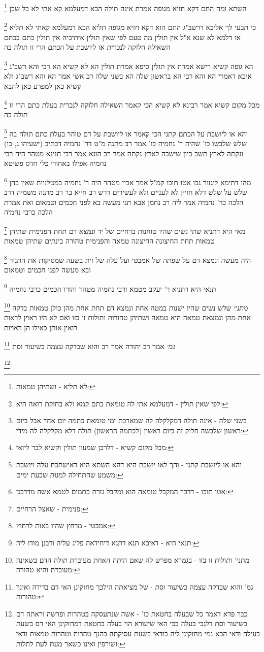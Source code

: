 \documentclass[12pt, openany]{book}
\newcommand{\footnotecomment}[1]{
	\renewcommand\thefootnote{}
	\footnote{#1}}
\newcommand{\commenta}[1]{\footnotecomment{#1}}
\begin{document}
{\commenta{לא תליא - ושתיהן טמאות:}
השתא ומה התם דקא חזיא מגופה אמרת אינה תולה הכא דמעלמא קא אתי לא כל שכן 
\commenta{לפי שאין תולין - דמעלמא אתי לה טומאת כתם קמא ולא בחזקת רואה היא:}
כי תבעי לך אליבא דרשב"ג התם הוא דקא חזיא מגופה תליא הכא דמעלמא קאתי לא תליא או דלמא לא שנא 
א"ל אין תולין מה טעם לפי שאין תולין 
איתיביה אין תולין כתם בכתם השאילה חלוקה לנכרית או ליושבת על הכתם הרי זו תולה בה 
\commenta{בשני שלה - אינה תולה דמקלקלה לה שמארכת ימי טומאת כתמה יום אחד אבל ביום ראשון שלבשה חלוק זה ביום ראשון (לכתמה הראשון) תולה דלא מקלקלה לה מידי:}
הא גופה קשיא רישא אמרת אין תולין סיפא אמרת תולין הא לא קשיא הא רבי והא רשב"ג 
איכא דאמרי הא והא רבי הא בראשון שלה הא בשני שלה 
רב אשי אמר הא והא רשב"ג ולא קשיא
כאן למפרע כאן להבא 
\commenta{מכל מקום קשיא - דלרבן שמעון תולין וקשיא לבר ליואי:}
מכל מקום קשיא אמר רבינא לא קשיא הכי קאמר השאילה חלוקה לנכרית בעלת כתם הרי זו תולה בה
\commenta{והא או ליושבת קתני - והך לאו יושבת היא דהא השתא היא דאישתכח עלה ויושבת משמע שהתחילה למנות שבעת ימים:}
והא או ליושבת על הכתם קתני הכי קאמר או ליושבת על דם טוהר בעלת כתם תולה בה
שלש שלבשו כו' שהיה ר' נחמיה כו' אמר רב מתנה מ"ט דר' נחמיה דכתיב (ישעיהו ג, כו) ונקתה לארץ תשב כיון שישבה לארץ נקתה 
אמר רב הונא אמר רבי חנינא מטהר היה רבי נחמיה אפילו באחורי כלי חרס פשיטא 
\commenta{אטו תוכו - דדבר המקבל טומאה הוא ומקבל גזרת כתמים לטמא אשה מדרבנן:}
מהו דתימא ליגזור גבו אטו תוכו קמ"ל 
אמר אביי מטהר היה ר' נחמיה במטלניות שאין בהן שלש על שלש דלא חזיין לא לעניים ולא לעשירים 
דרש רב חייא בר רב מתנה משמיה דרב הלכה כר' נחמיה אמר ליה רב נחמן אבא תני מעשה בא לפני חכמים וטמאום ואת אמרת הלכה כרבי נחמיה 
\commenta{פנימית - שאצל הרחיים:}
מאי היא דתניא שתי נשים שהיו טוחנות ברחיים של יד ונמצא דם תחת הפנימית שתיהן טמאות תחת החיצונה החיצונה טמאה והפנימית טהורה בינתים שתיהן טמאות 
\commenta{אמבטי - מרחץ שהיו באות לרחוץ:}
היה מעשה ונמצא דם על שפתה של אמבטי ועל עלה של זית בשעה שמסיקות את התנור ובא מעשה לפני חכמים וטמאום 
\commenta{תנאי היא - דאיכא תנא דתנא דיחידאה פליג עליה ורבנן מודו ליה:}
תנאי היא דתניא ר' יעקב מטמא ורבי נחמיה מטהר והורו חכמים כרבי נחמיה
\commenta{מתני' ותולות זו בזו - בגמרא מפרש לה שאם היתה האחת מעוברת תולה הדם בשאינה מעוברת והיא טהורה:}
{\large\emph{מתני׳}} שלש נשים שהיו ישנות במטה אחת ונמצא דם תחת אחת מהן כולן טמאות בדקה אחת מהן ונמצאת טמאה היא טמאה ושתיהן טהורות ותולות זו בזו ואם לא היו ראוין לראות רואין אותן כאילו הן ראויות
\commenta{גמ' והוא שבדקה עצמה כשיעור וסת - של מציאתה הילכך מחזקינן האי דם בדידה ואינך טהורות:}
{\large\emph{גמ׳}} אמר רב יהודה אמר רב והוא שבדקה עצמה בשיעור וסת 
\commenta{כבר פדא דאמר כל שבעלה בחטאת כו' - אשה שנתעסקה בטהרות ופרשה וראתה דם כשיעור וסת דלגבי בעלה בכי האי שיעורא הוי בעלה בחטאת דמחזקינן האי דם בשעת בעילה ודאי הכא נמי מחזקינן ליה בודאי בשעת עסיקתה בהנך טהרות וטהרות טמאות ודאי ושורפין ואינו כשאר מעת לעת לתלות:}
}
\end{document}
